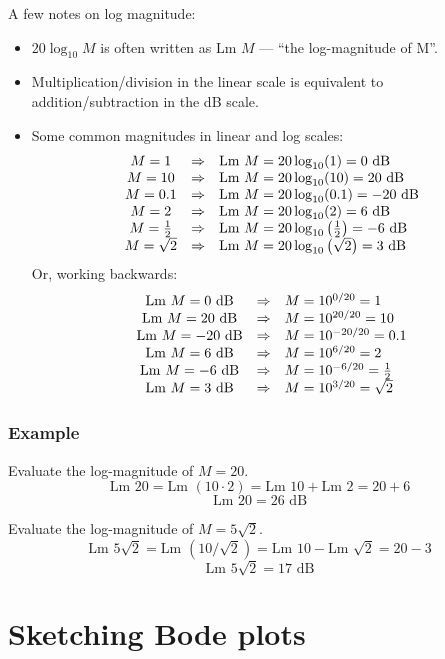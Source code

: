 \documentclass{book}
\newcommand{\Lm}{\textrm{Lm }}
\newcommand{\exmp}{\subsubsection*{Example}}
\begin{document}
A few notes on log magnitude:
\begin{itemize}
	\item $ 20\log_{10}M $ is often written as $ \Lm M $ --- ``the log-magnitude of M''.
	\item Multiplication/division in the linear scale is equivalent to addition/subtraction in the dB scale.
	\item Some common magnitudes in linear and log scales:
		\[ \begin{array}{c c l}
			M=1 & \Rightarrow & \Lm M = 20\log_{10}(1) = 0\text{ dB}\\
			M=10 & \Rightarrow & \Lm M = 20\log_{10}(10) = 20\text{ dB}\\
			M=0.1 & \Rightarrow & \Lm M = 20\log_{10}(0.1) = -20\text{ dB}\\
			M=2 & \Rightarrow & \Lm M = 20\log_{10}(2) = 6\text{ dB}\\
			M=\frac{1}{2} & \Rightarrow & \Lm M = 20\log_{10}\left(\frac{1}{2}\right) = -6\text{ dB}\\
			M=\sqrt{2} & \Rightarrow & \Lm M = 20\log_{10}\left(\sqrt{2}\right) = 3\text{ dB}\\
		\end{array} \]
		Or, working backwards:
		\[ \begin{array}{c c l}
			\Lm M=0\text{ dB} & \Rightarrow & M = 10^{0/20} = 1\\
			\Lm M=20\text{ dB} & \Rightarrow & M = 10^{20/20} = 10\\
			\Lm M=-20\text{ dB} & \Rightarrow & M = 10^{-20/20} = 0.1\\
			\Lm M=6\text{ dB} & \Rightarrow & M = 10^{6/20} = 2\\
			\Lm M=-6\text{ dB} & \Rightarrow & M = 10^{-6/20} = \frac{1}{2}\\
			\Lm M=3\text{ dB} & \Rightarrow & M = 10^{3/20} = \sqrt{2}\\
			\end{array} \]
\end{itemize}

\exmp
Evaluate the log-magnitude of $ M=20 $.
\[ \Lm 20 = \Lm (10\cdot 2) = \Lm10 + \Lm2= 20+6 \]
\[ \Lm20  = 26\text{ dB} \]

Evaluate the log-magnitude of $ M=5\sqrt{2} $.
\[ \Lm 5\sqrt{2} = \Lm \left(10/\sqrt{2}\right) = \Lm10 - \Lm\sqrt{2} = 20-3 \]
\[ \Lm 5\sqrt{2} = 17\text{ dB} \]

\section*{Sketching Bode plots}
\end{document}
